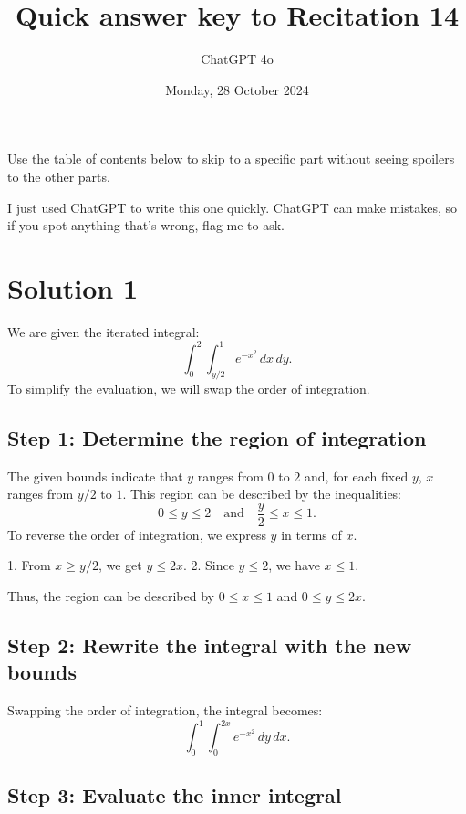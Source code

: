 \documentclass[11pt]{article}
\begin{document}
\title{Quick answer key to Recitation 14}
\author{ChatGPT 4o}
\date{Monday, 28 October 2024}
\maketitle

Use the table of contents below to skip to a specific part
without seeing spoilers to the other parts.

I just used ChatGPT to write this one quickly.
ChatGPT can make mistakes, so if you spot anything that's wrong, flag me to ask.

\tableofcontents

\section{Solution 1}
We are given the iterated integral:
\[
\int_{0}^{2} \int_{y/2}^{1} e^{-x^{2}} \, dx \, dy.
\]
To simplify the evaluation, we will swap the order of integration.

\newpage

\subsection{Step 1: Determine the region of integration}

The given bounds indicate that \( y \) ranges from \( 0 \) to \( 2 \) and, for each fixed \( y \), \( x \) ranges from \( y/2 \) to \( 1 \). This region can be described by the inequalities:
\[
0 \leq y \leq 2 \quad \text{and} \quad \frac{y}{2} \leq x \leq 1.
\]
To reverse the order of integration, we express \( y \) in terms of \( x \).

1. From \( x \geq y/2 \), we get \( y \leq 2x \).
2. Since \( y \leq 2 \), we have \( x \leq 1 \).

Thus, the region can be described by \( 0 \leq x \leq 1 \) and \( 0 \leq y \leq 2x \).
\newpage

\subsection{Step 2: Rewrite the integral with the new bounds}

Swapping the order of integration, the integral becomes:
\[
\int_{0}^{1} \int_{0}^{2x} e^{-x^{2}} \, dy \, dx.
\]
\newpage

\subsection{Step 3: Evaluate the inner integral}
\end{document}
